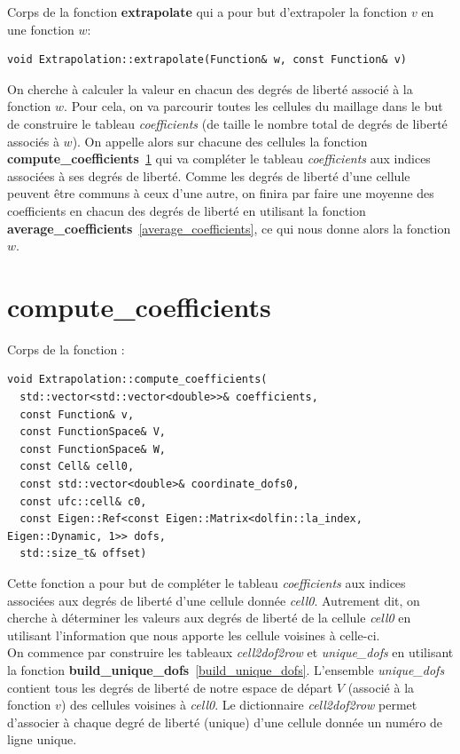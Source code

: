 \documentclass[french]{article}
\begin{document}
	
	Corps de la fonction \textbf{extrapolate} qui a pour but d'extrapoler la fonction $v$ en une fonction $w$:

	\begin{lstlisting}
void Extrapolation::extrapolate(Function& w, const Function& v)
	\end{lstlisting}
	
	On cherche à calculer la valeur en chacun des degrés de liberté associé à la fonction $w$. Pour cela, on va parcourir toutes les cellules du maillage dans le but de construire le tableau \textit{coefficients} (de taille le nombre total de degrés de liberté associés à $w$). On appelle alors sur chacune des cellules la fonction \textbf{compute\_coefficients}~\ref{compute_coefficients} qui va compléter le tableau \textit{coefficients} aux indices associées à ses degrés de liberté. Comme les degrés de liberté d'une cellule peuvent être communs à ceux d'une autre, on finira par faire une moyenne des coefficients en chacun des degrés de liberté en utilisant la fonction \textbf{average\_coefficients}~\ref{average_coefficients}, ce qui nous donne alors la fonction $w$. 
	
	\section{compute\_coefficients}
	\label{compute_coefficients}
	
	Corps de la fonction :
	
	\begin{lstlisting}
void Extrapolation::compute_coefficients(
  std::vector<std::vector<double>>& coefficients,
  const Function& v,
  const FunctionSpace& V,
  const FunctionSpace& W,
  const Cell& cell0,
  const std::vector<double>& coordinate_dofs0,
  const ufc::cell& c0,
  const Eigen::Ref<const Eigen::Matrix<dolfin::la_index, Eigen::Dynamic, 1>> dofs,
  std::size_t& offset)
	\end{lstlisting}
	
	Cette fonction a pour but de compléter le tableau \textit{coefficients} aux indices associées aux degrés de liberté d'une cellule donnée \textit{cell0}. Autrement dit, on cherche à déterminer les valeurs aux degrés de liberté de la cellule \textit{cell0} en utilisant l'information que nous apporte les cellule voisines à celle-ci.\\
	
	On commence par construire les tableaux \textit{cell2dof2row} et \textit{unique\_dofs} en utilisant la fonction \textbf{build\_unique\_dofs}~\ref{build_unique_dofs}. L'ensemble \textit{unique\_dofs} contient tous les degrés de liberté de notre espace de départ $V$ (associé à la fonction $v$) des cellules voisines à \textit{cell0}. Le dictionnaire \textit{cell2dof2row} permet d'associer à chaque degré de liberté (unique) d'une cellule donnée un numéro de ligne unique. 
	
\end{document}
